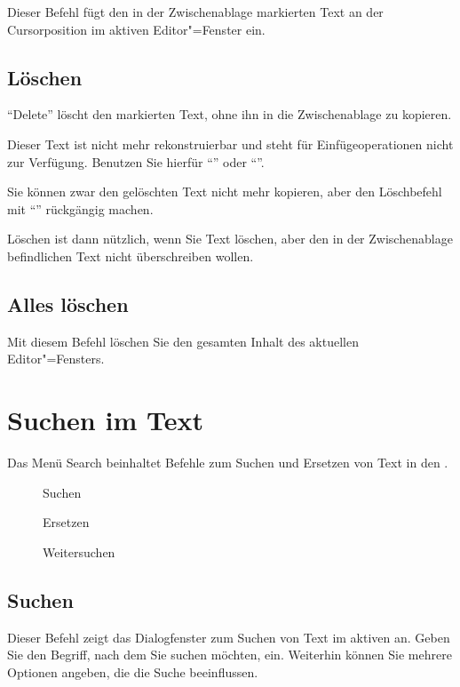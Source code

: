 Dieser Befehl fügt den in der Zwischenablage markierten Text 
an der Cursorposition im aktiven Editor"=Fenster ein.


\subsection{Löschen}
\label{sec:MI_DELETE}
"`Delete"' löscht den markierten Text, ohne ihn in die Zwischenablage 
zu kopieren.


Dieser Text ist nicht mehr rekonstruierbar und steht für Einfügeoperationen 
nicht zur Verfügung. Benutzen Sie hierfür "`"'
oder "`"'.


Sie können zwar den gelöschten Text nicht mehr kopieren, aber den
Löschbefehl mit "`"' rückgängig
machen.

Löschen ist dann nützlich, wenn Sie Text löschen, aber 
den in der Zwischenablage befindlichen Text nicht überschreiben 
wollen.


\subsection{Alles löschen}
\label{sec:MI_CLEAR}
Mit diesem Befehl löschen Sie den gesamten Inhalt des aktuellen 
Editor"=Fensters.




\section{Suchen im Text}\label{sec:MS_SEARCH}
Das Menü Search beinhaltet Befehle zum Suchen und Ersetzen 
von Text in den .

\begin{description}
\item[] Suchen
\item[] Ersetzen
\item[] Weitersuchen
\end{description}

\subsection{Suchen}
\label{sec:MI_FIND}

Dieser Befehl zeigt das Dialogfenster zum Suchen von Text im 
aktiven  an. Geben Sie den Begriff, 
nach dem Sie suchen möchten, ein. Weiterhin können Sie mehrere 
Optionen angeben, die die Suche beeinflussen.


